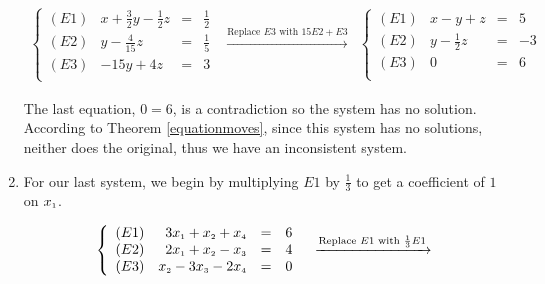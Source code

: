 \begin{ex}
\begin{enumerate}
\[\begin{array}{ccc}
\left\{ 

\begin{array}{lrcr}

(E1) & x+\frac{3}{2}y-\frac{1}{2}z & = & \frac{1}{2} \\ [3pt]
(E2) & y - \frac{4}{15}z & = & \frac{1}{5} \\ [3pt]
(E3) & -15y+4z & = & 3 \\

\end{array} 

\right.
&
\xrightarrow{\text{Replace $E3$ with $15E2 + E3$}}

&

\left\{ 

\begin{array}{lrcr}

(E1) & x-y+z & = & 5 \\ [3pt]
(E2) & y - \frac{1}{2}z & = & -3\\ [3pt]
(E3) & 0 & = & 6 \\

\end{array} 

\right.
\end{array}\]

The last equation, $0=6$, is a contradiction so the system has no solution.  According to Theorem \ref{equationmoves}, since this system has no solutions, neither does the original, thus we have an inconsistent system.

\item  For our last system, we begin by multiplying $E1$ by $\frac{1}{3}$ to get a coefficient of $1$ on  $x_{\mbox{\tiny$1$}}$.

\[\begin{array}{ccc}

\left\{ 

\begin{array}{lrcr}

(E1) & 3x_{\mbox{\tiny$1$}} +x_{\mbox{\tiny$2$}} + x_{\mbox{\tiny$4$}} & = & 6 \\   
(E2) & 2x_{\mbox{\tiny$1$}} + x_{\mbox{\tiny$2$}} -x_{\mbox{\tiny$3$}}  & = & 4  \\
(E3) &  x_{\mbox{\tiny$2$}} -3x_{\mbox{\tiny$3$}} -2x_{\mbox{\tiny$4$}} & = & 0 \\

\end{array} 

\right.

&
\xrightarrow{\text{Replace $E1$ with $\frac{1}{3}E1$}}


\end{array}\]
\end{enumerate}
\end{ex}
